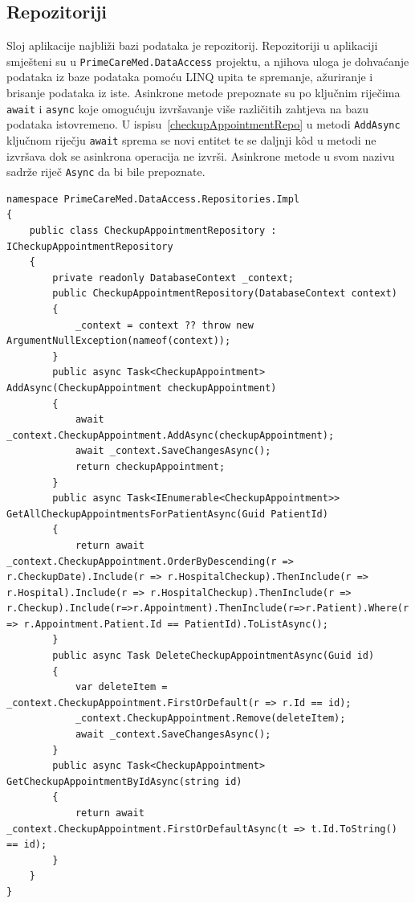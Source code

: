 \subsection{Repozitoriji}
\label{subsec:repo}
Sloj aplikacije najbliži bazi podataka je repozitorij. Repozitoriji u aplikaciji smješteni su u \texttt{PrimeCareMed.DataAccess} projektu, a njihova uloga je dohvaćanje podataka iz baze podataka pomoću LINQ upita te spremanje, ažuriranje i brisanje podataka iz iste\cite{linq}. Asinkrone metode prepoznate su po ključnim riječima \texttt{await} i \texttt{async} koje omogućuju izvršavanje više različitih zahtjeva na bazu podataka istovremeno. U ispisu~\ref{checkupAppointmentRepo} u metodi \texttt{AddAsync} ključnom riječju \texttt{await} sprema se novi entitet te se daljnji k\^od u metodi ne izvršava dok se asinkrona operacija ne izvrši. Asinkrone metode u svom nazivu sadrže riječ \texttt{Async} da bi bile prepoznate.

\begin{lstlisting}[caption={\texttt{CheckupAppointment} repozitorij}, label=checkupAppointmentRepo]
namespace PrimeCareMed.DataAccess.Repositories.Impl
{
    public class CheckupAppointmentRepository : ICheckupAppointmentRepository
    {
        private readonly DatabaseContext _context;
        public CheckupAppointmentRepository(DatabaseContext context)
        {
            _context = context ?? throw new ArgumentNullException(nameof(context));
        }
        public async Task<CheckupAppointment> AddAsync(CheckupAppointment checkupAppointment)
        {
            await _context.CheckupAppointment.AddAsync(checkupAppointment);
            await _context.SaveChangesAsync();
            return checkupAppointment;
        }
        public async Task<IEnumerable<CheckupAppointment>> GetAllCheckupAppointmentsForPatientAsync(Guid PatientId)
        {
            return await _context.CheckupAppointment.OrderByDescending(r => r.CheckupDate).Include(r => r.HospitalCheckup).ThenInclude(r => r.Hospital).Include(r => r.HospitalCheckup).ThenInclude(r => r.Checkup).Include(r=>r.Appointment).ThenInclude(r=>r.Patient).Where(r => r.Appointment.Patient.Id == PatientId).ToListAsync();
        }
        public async Task DeleteCheckupAppointmentAsync(Guid id)
        {
            var deleteItem = _context.CheckupAppointment.FirstOrDefault(r => r.Id == id);
            _context.CheckupAppointment.Remove(deleteItem);
            await _context.SaveChangesAsync();
        }
        public async Task<CheckupAppointment> GetCheckupAppointmentByIdAsync(string id)
        {
            return await _context.CheckupAppointment.FirstOrDefaultAsync(t => t.Id.ToString() == id);
        }
    }
}
\end{lstlisting}

